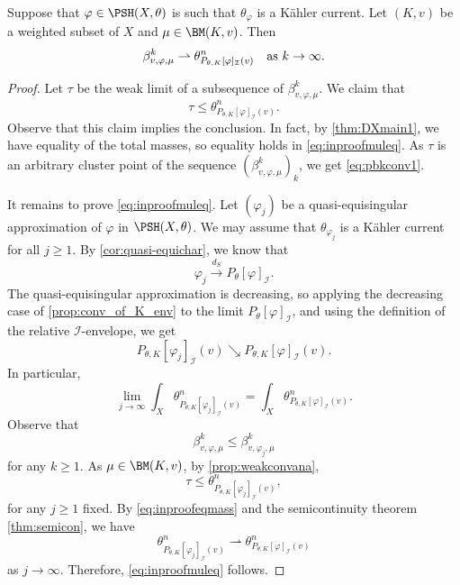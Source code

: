 \begin{proposition} \label{prop:mainKahcurr}
Suppose that $\varphi \in \PSH(X,\theta)$ is such that $\theta_{\varphi}$ is a Kähler current.
Let $(K,v)$ be a weighted subset of $X$ and $\mu\in \BM(K,v)$. Then
\begin{equation}\label{eq:pbkconv1}
\beta^k_{v,\varphi,\mu} \rightharpoonup \theta_{P_{\theta,K}[\varphi]_{\mathcal{I}}(v)}^n\quad \textup{as } k\to\infty.
\end{equation}
\end{proposition}
\begin{proof} Let $\tau$ be the weak limit of a subsequence of $\beta^k_{v,\varphi,\mu}$. We claim that
\begin{equation}\label{eq:inproofmuleq}
\tau\leq \theta_{P_{\theta,K}[\varphi]_{\mathcal{I}}(v)}^n.
\end{equation}
Observe that this claim implies the conclusion. In fact, by \cref{thm:DXmain1}, we have equality of the total masses, so equality holds in \eqref{eq:inproofmuleq}. As $\tau$ is an arbitrary cluster point of the sequence $(\beta^k_{v,\varphi,\mu})_k$, we get \eqref{eq:pbkconv1}.

It remains to prove \eqref{eq:inproofmuleq}.
Let $(\varphi_j)$ be a quasi-equisingular approximation of $\varphi$ in $\PSH(X,\theta)$. We may assume that $\theta_{\varphi_j}$ is a K\"ahler current for all $j\geq 1$.
By \cref{cor:quasi-equichar}, we know that
\[
\varphi_j\xrightarrow{d_S}P_{\theta}[\varphi]_{\mathcal{I}}.
\]
The quasi-equisingular approximation is decreasing, so applying the decreasing case of \cref{prop:conv_of_K_env} to the limit $P_{\theta}[\varphi]_{\mathcal{I}}$, and using the definition of the relative $\mathcal{I}$-envelope, we get
\[
P_{\theta,K}\left[\varphi_j\right]_{\mathcal{I}}(v)\searrow P_{\theta,K}[\varphi]_{\mathcal{I}}(v).
\]
In particular,
\begin{equation}\label{eq:inproofeqmass}
\lim_{j\to\infty} \int_X \theta_{P_{\theta,K}\left[\varphi_j\right]_{\mathcal{I}}(v)}^n= \int_X  \theta_{P_{\theta,K}[\varphi]_{\mathcal{I}}(v)}^n.
\end{equation}
Observe that
\[
\beta^k_{v,\varphi,\mu} \leq \beta^k_{v,\varphi_j,\mu}
\]
for any $k \geq 1$.
As $\mu\in \BM(K,v)$,
by \cref{prop:weakconvana},
\[
\tau \leq \theta_{P_{\theta,K}[\varphi_j]_{\mathcal{I}}(v)}^n,
\]
for any $j \geq 1$ fixed.
By \eqref{eq:inproofeqmass} and the semicontinuity theorem \cref{thm:semicon}, we have
\[
\theta_{P_{\theta,K}\left[\varphi_j\right]_{\mathcal{I}}(v)}^n\rightharpoonup \theta_{P_{\theta,K}[\varphi]_{\mathcal{I}}(v)}^n
\]
as $j\to\infty$. Therefore, \eqref{eq:inproofmuleq} follows.
\end{proof}





